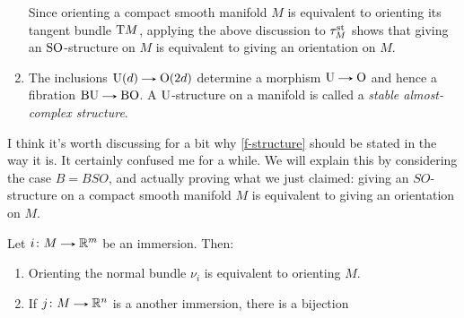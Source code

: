 \begin{examples}
\begin{enumerate}
    Since orienting a compact smooth manifold $M$ is equivalent to
    orienting its tangent bundle $\mathrm{T} M$, applying the above discussion
    to $\tau^{\mathrm{st}}_M$ shows that giving an $\mathrm{SO}$-structure on $M$ is
    equivalent to giving an orientation on $M$.
  \item The inclusions $\U(d) \to \O(2d)$ determine a morphism $\U \to
    \O$ and hence a fibration $\B\U \to \B\O$. A $\mathrm{U}$-structure on a
    manifold is called a \emph{stable almost-complex structure}.
  \end{enumerate}
\end{examples}

I think it's worth discussing for a bit why \eqref{f-structure} should
be stated in the way it is. It certainly confused me for a while. We
will explain this by considering the case $B = BSO$, and actually
proving what we just claimed: giving an $SO$-structure on a compact
smooth manifold $M$ is equivalent to giving an orientation on $M$.

\begin{lemma} \label{normal-orientation}
  Let $i \c M \to \R^m$ be an immersion. Then:
  \begin{enumerate}
  \item Orienting the normal bundle $\nu_i$ is equivalent to orienting
    $M$.
  \item If $j \c M \to \R^n$ is a another immersion, there is a
    bijection
  \end{enumerate}
\end{lemma}

